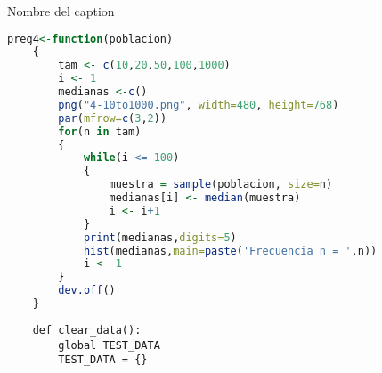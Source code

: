 
\renewcommand{\listingscaption}{Código Fuente}
\renewcommand\listoflistingscaption{Índice de Códigos}
\listoflistings

\begin{listing}[ht]
    \inputminted{octave}{nombre_archivo}
    \caption{Nombre del caption}
    \label{listing:ref}
\end{listing}


\begin{lstlisting}[caption=Resolución en R, language=r]
	preg4<-function(poblacion)
	{
		tam <- c(10,20,50,100,1000)
		i <- 1
		medianas <-c()
		png("4-10to1000.png", width=480, height=768)
		par(mfrow=c(3,2))
		for(n in tam)
		{
			while(i <= 100)
			{
				muestra = sample(poblacion, size=n)
				medianas[i] <- median(muestra)
				i <- i+1
			}
			print(medianas,digits=5)
			hist(medianas,main=paste('Frecuencia n = ',n))
			i <- 1
		}
		dev.off()
	}
\end{lstlisting}

\begin{verbatim}
    def clear_data():
        global TEST_DATA
        TEST_DATA = {}
\end{verbatim}
